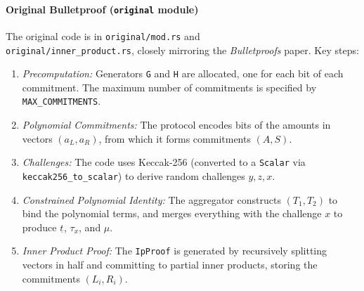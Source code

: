 \paragraph{Original Bulletproof (\texttt{original} module)}
The original code is in \texttt{original/mod.rs} and \\
\texttt{original/inner\_product.rs}, closely mirroring the \textit{Bulletproofs} paper.  Key steps:
\begin{enumerate}
    \item \emph{Precomputation:} Generators \texttt{G} and \texttt{H} are allocated, one for each bit of each commitment.  The maximum number of commitments is specified by \texttt{MAX\_COMMITMENTS}. %
    \item \emph{Polynomial Commitments:} The protocol encodes bits of the amounts in vectors $(a_L, a_R)$, from which it forms commitments $(A, S)$. %
    \item \emph{Challenges:} The code uses Keccak-256 (converted to a \texttt{Scalar} via \texttt{keccak256\_to\_scalar}) to derive random challenges $y, z, x$. %
    \item \emph{Constrained Polynomial Identity:} The aggregator constructs $(T_1, T_2)$ to bind the polynomial terms, and merges everything with the challenge $x$ to produce $t_{\hat{}}$, $\tau_x$, and $\mu$. %
    \item \emph{Inner Product Proof:} The \texttt{IpProof} is generated by recursively splitting vectors in half and committing to partial inner products, storing the commitments $(L_i, R_i)$. %
\end{enumerate}

